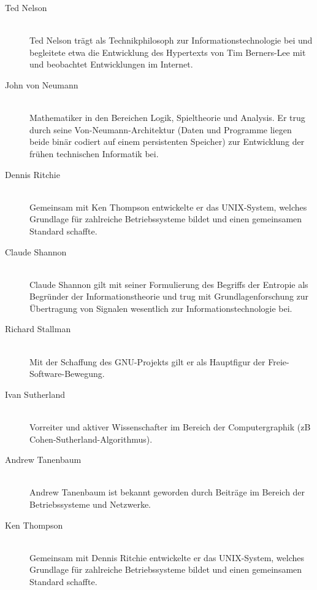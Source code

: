 \begin{description}
  \item[Ted Nelson ] \hfill{} \\
    Ted Nelson trägt als Technikphilosoph zur Informationstechnologie bei und begleitete etwa die Entwicklung des Hypertexts von Tim Berners-Lee mit und beobachtet Entwicklungen im Internet.

  \item[John von Neumann ] \hfill{} \\
    Mathematiker in den Bereichen Logik, Spieltheorie und Analysis. Er trug durch seine Von-Neumann-Architektur (Daten und Programme liegen beide binär codiert auf einem persistenten Speicher) zur Entwicklung der frühen technischen Informatik bei.

  \item[Dennis Ritchie ] \hfill{} \\
    Gemeinsam mit Ken Thompson entwickelte er das UNIX-System, welches Grundlage für zahlreiche Betriebssysteme bildet und einen gemeinsamen Standard schaffte.

  \item[Claude Shannon ] \hfill{} \\
    Claude Shannon gilt mit seiner Formulierung des Begriffs der Entropie als Begründer der Informationstheorie und trug mit Grundlagenforschung zur Übertragung von Signalen wesentlich zur Informationstechnologie bei.

  \item[Richard Stallman ] \hfill{} \\
    Mit der Schaffung des GNU-Projekts gilt er als Hauptfigur der Freie-Software-Bewegung.

  \item[Ivan Sutherland ] \hfill{} \\
    Vorreiter und aktiver Wissenschafter im Bereich der Computergraphik (zB Cohen-Sutherland-Algorithmus).

  \item[Andrew Tanenbaum ] \hfill{} \\
    Andrew Tanenbaum ist bekannt geworden durch Beiträge im Bereich der Betriebssysteme und Netzwerke.

  \item[Ken Thompson ] \hfill{} \\
    Gemeinsam mit Dennis Ritchie entwickelte er das UNIX-System, welches Grundlage für zahlreiche Betriebssysteme bildet und einen gemeinsamen Standard schaffte.


\end{description}
